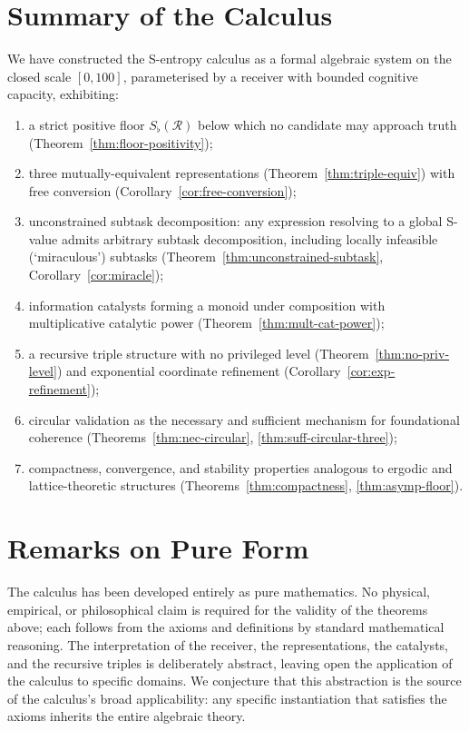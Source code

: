 \documentclass[twocolumn,11pt,a4paper]{article}
\theoremstyle{thmstyle}
\theoremstyle{thmstyle}
\theoremstyle{definition}
\theoremstyle{remark}
\newcommand{\receiver}{\mathcal{R}}
\newcommand{\Sfloor}{S_{\flat}}
\begin{document}
\section{Summary of the Calculus}
\label{sec:summary-calculus}

We have constructed the S-entropy calculus as a
formal algebraic system on the closed scale
$[0, 100]$, parameterised by a receiver with
bounded cognitive capacity, exhibiting:

\begin{enumerate}[label=\textbf{(\arabic*)},leftmargin=*]
\item a strict positive floor $\Sfloor(\receiver)$
      below which no candidate may approach truth
      (Theorem~\ref{thm:floor-positivity});
\item three mutually-equivalent representations
      (Theorem~\ref{thm:triple-equiv}) with free
      conversion (Corollary~\ref{cor:free-conversion});
\item unconstrained subtask decomposition: any
      expression resolving to a global S-value
      admits arbitrary subtask decomposition,
      including locally infeasible (`miraculous')
      subtasks (Theorem~\ref{thm:unconstrained-subtask},
      Corollary~\ref{cor:miracle});
\item information catalysts forming a monoid under
      composition with multiplicative catalytic
      power (Theorem~\ref{thm:mult-cat-power});
\item a recursive triple structure with no
      privileged level (Theorem~\ref{thm:no-priv-level})
      and exponential coordinate refinement
      (Corollary~\ref{cor:exp-refinement});
\item circular validation as the necessary and
      sufficient mechanism for foundational
      coherence (Theorems~\ref{thm:nec-circular},
      \ref{thm:suff-circular-three});
\item compactness, convergence, and stability
      properties analogous to ergodic and
      lattice-theoretic structures
      (Theorems~\ref{thm:compactness},
      \ref{thm:asymp-floor}).
\end{enumerate}

\section{Remarks on Pure Form}
\label{sec:pure-form}

The calculus has been developed entirely as pure
mathematics.  No physical, empirical, or
philosophical claim is required for the validity of
the theorems above; each follows from the axioms
and definitions by standard mathematical reasoning.
The interpretation of the receiver, the
representations, the catalysts, and the recursive
triples is deliberately abstract, leaving open the
application of the calculus to specific domains.
We conjecture that this abstraction is the source
of the calculus's broad applicability: any
specific instantiation that satisfies the axioms
inherits the entire algebraic theory.
\end{document}
